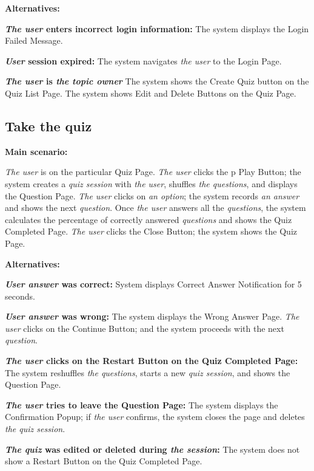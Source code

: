 \documentclass[
    english, %
]{VUMIFPSkursinis}
\begin{document}
\noindent\textbf{\fontsize{13}{15}\selectfont Alternatives:}

\textbf{\textit{The user} enters incorrect login information:} The system displays the Login Failed Message.

\textbf{\textit{User} session expired:} The system navigates \textit{the user} to the Login Page.

\textbf{\textit{The user} is \textit{the topic owner}} The system shows the Create Quiz button on the Quiz List Page. The system shows Edit and Delete Buttons on the Quiz Page.

\subsection{Take the quiz}

\noindent\textbf{\fontsize{13}{15}\selectfont Main scenario:}

\textit{The user} is on the particular Quiz Page. \textit{The user} clicks the p
Play Button; the system creates a \textit{quiz session} with \textit{the user}, shuffles \textit{the questions}, and displays the Question Page. \textit{The user} clicks on \textit{an option}; the system records \textit{an answer} and shows the next \textit{question}. Once \textit{the user} answers all the \textit{questions}, the system calculates the percentage of correctly answered \textit{questions} and shows the Quiz Completed Page. \textit{The user} clicks the Close Button; the system shows the Quiz Page.

\noindent\textbf{\fontsize{13}{15}\selectfont Alternatives:}

\textbf{\textit{User answer} was correct:} System displays Correct Answer Notification for 5 seconds.

\textbf{\textit{User answer} was wrong:} The system displays the Wrong Answer Page. \textit{The user} clicks on the Continue Button; and the system proceeds with the next \textit{question}.

\textbf{\textit{The user} clicks on the Restart Button on the Quiz Completed Page:} The system reshuffles \textit{the questions}, starts a new \textit{quiz session}, and shows the Question Page.

\textbf{\textit{The user} tries to leave the Question Page:} The system displays the Confirmation Popup; if \textit{the user} confirms, the system closes the page and deletes \textit{the quiz session}.

\textbf{\textit{The quiz} was edited or deleted during \textit{the session}:} The system does not show a Restart Button on the Quiz Completed Page.
\end{document}
